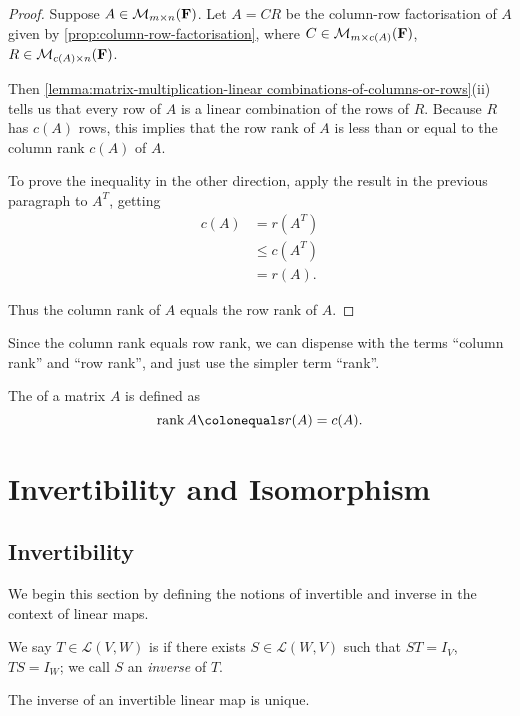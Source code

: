 \begin{proof}
Suppose $A\in\mathcal{M}_{m\times n}(\mathbf F)$. Let $A=CR$ be the column-row factorisation of $A$ given by \ref{prop:column-row-factorisation}, where $C\in\mathcal{M}_{m\times c(A)}(\mathbf F)$, $R\in\mathcal{M}_{c(A)\times n}(\mathbf F)$.

Then \ref{lemma:matrix-multiplication-linear combinations-of-columns-or-rows}(ii) tells us that every row of $A$ is a linear combination of the rows of $R$. Because $R$ has $c(A)$ rows, this implies that the row rank of $A$ is less than or equal to the column rank $c(A)$ of $A$.

To prove the inequality in the other direction, apply the result in the previous paragraph to $A^T$, getting 
\begin{align*}
c(A)&=r(A^T)\\
&\le c(A^T)\\
&=r(A).
\end{align*}

Thus the column rank of $A$ equals the row rank of $A$.
\end{proof}

Since the column rank equals row rank, we can dispense with the terms ``column rank'' and ``row rank'', and just use the simpler term ``rank''.

\begin{definition}[Rank]
The  of a matrix $A$ is defined as
\[\rank A\colonequals r(A)=c(A).\]
\end{definition}
\pagebreak

\section{Invertibility and Isomorphism}
\subsection{Invertibility}
We begin this section by defining the notions of invertible and inverse in the context of linear maps.

\begin{definition}[Invertibility]
We say $T\in\mathcal{L}(V,W)$ is  if there exists $S\in\mathcal{L}(W,V)$ such that $ST=I_V$, $TS=I_W$; we call $S$ an \emph{inverse} of $T$.
\end{definition}

\begin{lemma}
The inverse of an invertible linear map is unique.
\end{lemma}

